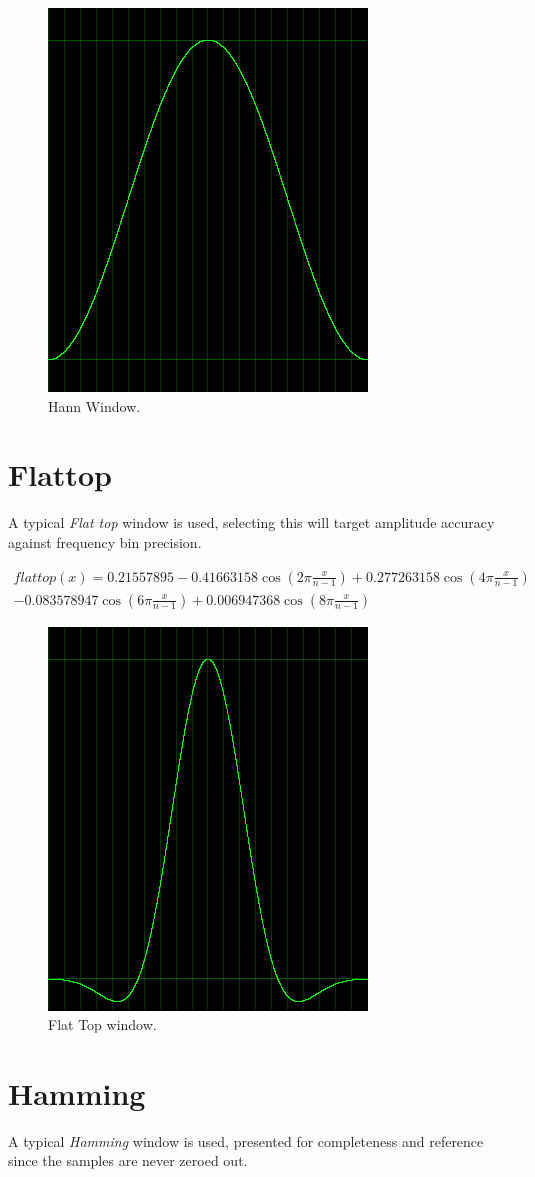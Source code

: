 \documentclass[10pt,a4paper]{report}
\begin{document}
\begin{appendices}
\begin{figure}[H]
	\centering
	\includegraphics[width=0.4\linewidth]{images/windows/window-hann.png}
	\caption[Hann Window]{Hann Window.}
	\label{fig:window-hann}
\end{figure}

\section{Flattop}
A typical \textit{Flat top} window is used, selecting this will target amplitude accuracy against frequency bin precision.

\begin{align*}
flattop(x)=0.21557895 - 0.41663158\cos(2\pi\frac{x}{n-1})+ 0.277263158\cos(4\pi\frac{x}{n-1})\\
- 0.083578947\cos(6\pi\frac{x}{n-1}) + 0.006947368\cos(8\pi\frac{x}{n-1})
\end{align*}

\begin{figure}[H]
	\centering
	\includegraphics[width=0.4\linewidth]{images/windows/window-flattop.png}
	\caption[Flat Top window]{Flat Top window.}
	\label{fig:window-flattop}
\end{figure}

\section{Hamming}
A typical \textit{Hamming} window is used, presented for completeness and reference since the samples are never zeroed out.


\end{appendices}
\end{document}

